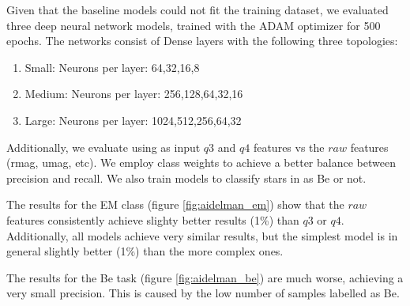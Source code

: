 \documentclass{article}
\begin{document}
Given that the baseline models could not fit the training dataset, we evaluated three deep neural network models, trained with the ADAM optimizer for 500 epochs. The networks consist of Dense layers with the following three topologies:

\begin{enumerate}
    \item Small: Neurons per layer: 64,32,16,8 
    \item Medium: Neurons per layer: 256,128,64,32,16
    \item Large: Neurons per layer: 1024,512,256,64,32
\end{enumerate}


Additionally, we evaluate using as input $q3$ and $q4$ features vs the $raw$ features (rmag, umag, etc). We employ class weights to achieve a better balance between precision and recall. We also train models to classify stars in as Be or not.

The results for the EM class (figure  \ref{fig:aidelman_em}) show that the $raw$ features consistently achieve slighty better results (1\%) than $q3$ or $q4$. Additionally, all models achieve very similar results, but the simplest model is in general slightly better (1\%) than the more complex ones.

The results for the Be task (figure \ref{fig:aidelman_be}) are much worse, achieving a very small precision. This is caused by the low number of samples labelled as Be.
\end{document}
